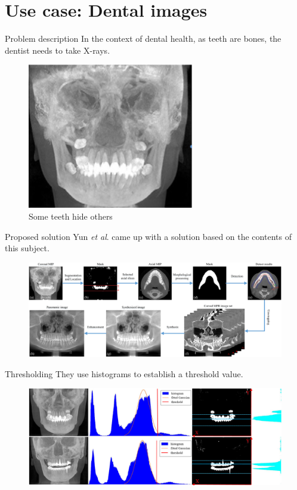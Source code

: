 \section{Use case: Dental images}

\begin{frame}{\secname}{Problem description}
    In the context of dental health, as teeth are bones, the dentist needs to take X-rays.
    \begin{figure}
        \centering
        \includegraphics{img/dental_problem}
        \caption{Some teeth hide others \cite{yun_automatic_2019}}
    \end{figure}
\end{frame}

\begin{frame}{\secname}{Proposed solution}
    Yun \textit{et al}. \cite{yun_automatic_2019} came up with a solution based on the contents of this subject.
    \begin{figure}
        \includegraphics[width=\textwidth]{img/dental_proposal}
    \end{figure} 
\end{frame}

\begin{frame}{\secname}{Thresholding}
    They use histograms to establish a threshold value.
    \begin{figure}
        \includegraphics[width=\textwidth]{img/dental_thresh}
    \end{figure} 
\end{frame}


